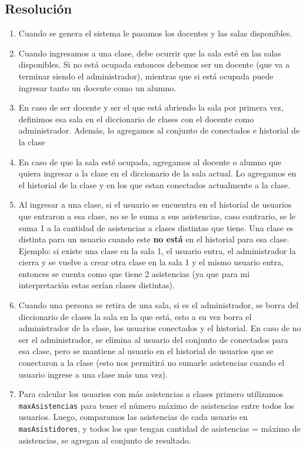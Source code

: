 \documentclass[10pt, a4paper]{article}
\begin{document}
\subsection*{Resoluci\'on}
\begin{enumerate}
\item Cuando se genera el sistema le pasamos los docentes y las salas disponibles.
\item Cuando ingresamos a una clase, debe ocurrir que la sala est\'e en las salas disponibles. Si no est\'a ocupada entonces debemos ser un docente (que va a terminar siendo el administrador), mientras que si est\'a ocupada puede ingresar tanto un docente como un alumno.
\item En caso de ser docente y ser el que est\'a abriendo la sala por primera vez, definimos esa sala en el diccionario de clases con el docente como administrador. Adem\'as, lo agregamos al conjunto de conectados e historial de la clase
\item En caso de que la sala est\'e ocupada, agregamos al docente o alumno que quiera ingresar a la clase en el diccionario de la sala actual. Lo agregamos en el historial de la clase y en los que estan conectados actualmente a la clase.
\item Al ingresar a una clase, si el usuario se encuentra en el historial de usuarios que entraron a esa clase, no se le suma a sus asistencias, caso contrario, se le suma 1 a la cantidad de asistencias a clases distintas que tiene. Una clase es distinta para un usuario cuando este \textbf{no est\'a} en el historial para esa clase. Ejemplo: si existe una clase en la sala 1, el usuario entra, el administrador la cierra y se vuelve a crear otra clase en la sala 1 y el mismo usuario entra, entonces se cuenta como que tiene 2 asistencias (ya que para mi interpretaci\'on estas ser\'ian clases distintas).
\item Cuando una persona se retira de una sala, si es el administrador, se borra del diccionario de clases la sala en la que est\'a, esto a su vez borra el administrador de la clase, los usuarios conectados y el historial. En caso de no ser el administrador, se elimina al usuario del conjunto de conectados para esa clase, pero se mantiene al usuario en el historial de usuarios que se conectaron a la clase (esto nos permitir\'a no sumarle asistencias cuando el usuario ingrese a una clase m\'as una vez).
\item Para calcular los usuarios con m\'as asistencias a clases primero utilizamos \texttt{maxAsistencias} para tener el n\'umero m\'aximo de  asistencias entre todos los usuarios. Luego, comparamos las asistencias de cada usuario en \texttt{masAsistidores}, y todos los que tengan cantidad de asistencias = m\'aximo de asistencias, se agregan al conjunto de resultado.
\end{enumerate}
\end{document}
